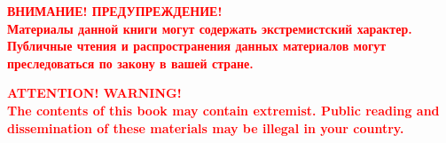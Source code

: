 \pagecolor{black}
\vspace*{\fill}
\begin{center}
\textbf{\textcolor{red}{\Large\MakeUppercase{Внимание! Предупреждение!}\large\\
Материалы данной книги могут содержать экстремистский характер. 
Публичные чтения и распространения данных материалов могут преследоваться по закону в вашей стране.}}\\
\vspace*{2cm}

\textbf{\textcolor{red}{\Large\uppercase{Attention! Warning!}\large\\
The contents of this book may contain extremist.
Public reading and dissemination of these materials may be illegal in your country.}}
\end{center}
\vspace*{\fill}
